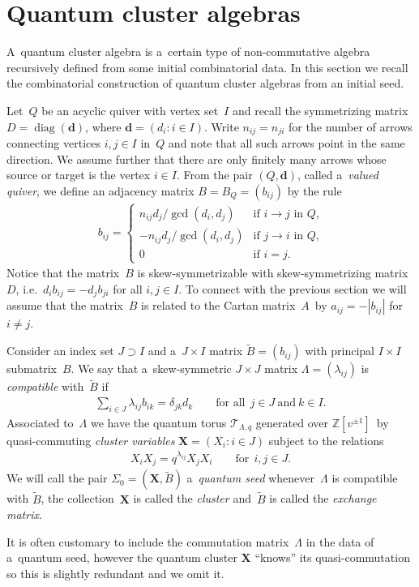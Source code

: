 \documentclass[pdftex]{sigma}
\numberwithin{equation}{section}
\begin{document}
\section{Quantum cluster algebras}\label{sec:qca}

A~quantum cluster algebra is a~certain type of non-commutative algebra recursively def\/ined from some initial combinatorial data.
In this section we recall the combinatorial construction of quantum cluster algebras from an initial seed.

Let~$Q$ be an acyclic quiver with vertex set~$I$ and recall the symmetrizing matrix $D=\operatorname{diag}(\mathbf{d})$,
where $\mathbf{d}=(d_i: i\in I)$.
Write $n_{ij}=n_{ji}$ for the number of arrows connecting vertices $i,j\in I$ in~$Q$ and note that all such arrows point in the same direction.
We assume further that there are only f\/initely many arrows whose source or target is the vertex $i\in I$.
From the pair $(Q,\mathbf{d})$, called a~\emph{valued quiver}, we def\/ine an adjacency matrix $B=B_Q=(b_{ij})$ by the rule
\begin{gather*}
b_{ij}=
\begin{cases}
n_{ij}d_j/\gcd(d_i,d_j) & \text{if $i\to j$ in~$Q$,}
\\
-n_{ij}d_j/\gcd(d_i,d_j) & \text{if $j\to i$ in~$Q$,}
\\
0 & \text{if $i=j$.}
\end{cases}
\end{gather*}
Notice that the matrix~$B$ is skew-symmetrizable with skew-symmetrizing matrix~$D$, i.e.~$d_ib_{ij}=-d_jb_{ji}$ for all $i,j\in I$.
To connect with the previous section we will assume that the matrix~$B$ is related to the Cartan matrix~$A$~by
$a_{ij}=-|b_{ij}|$ for $i\ne j$.

Consider an index set $J\supset I$ and a~$J\times I$ matrix $\widetilde B=(b_{ij})$ with principal $I\times I$
submatrix~$B$.
We say that a~skew-symmetric $J\times J$ matrix $\Lambda=(\lambda_{ij})$ is \emph{compatible} with~$\widetilde B$ if
\begin{gather*}
\sum\limits_{i\in J} \lambda_{ij}b_{ik}=\delta_{jk}d_k
\qquad
\text{for all} \ \   j\in J \ \text{and} \ k\in I.
\end{gather*}
Associated to~$\Lambda$ we have the quantum torus $\mathcal{T}_{\Lambda,q}$ generated over $\mathbb{Z}[v^{\pm1}]$~by
quasi-commuting \emph{cluster variables} $\mathbf{X}=(X_i: i\in J)$ subject to the relations
\begin{gather*}
X_iX_j=q^{\lambda_{ij}}X_jX_i
\qquad
\text{for} \ \ i,j\in J.
\end{gather*}
We will call the pair $\Sigma_0=(\mathbf{X},\widetilde B)$ a~\emph{quantum seed} whenever~$\Lambda$ is compatible with
$\widetilde B$, the collection~$\mathbf{X}$ is called the \emph{cluster} and~$\widetilde B$ is called the \emph{exchange matrix}.
\begin{Remark}
It is often customary to include the commutation matrix~$\Lambda$ in the data of a~quantum seed, however the quantum
cluster $\mathbf{X}$ ``knows'' its quasi-commutation so this is slightly redundant and we omit it.
\end{Remark}
\end{document}

